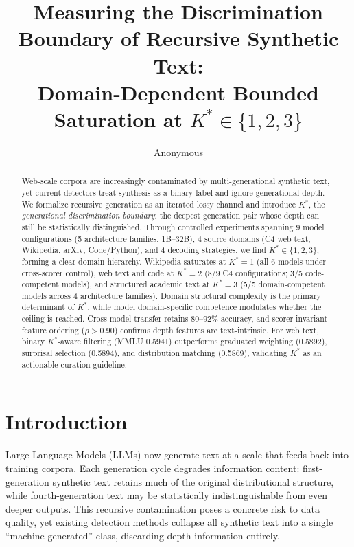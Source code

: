 \documentclass[11pt,a4paper]{article}
\title{Measuring the Discrimination Boundary of Recursive Synthetic Text:\\Domain-Dependent Bounded Saturation at $K^*\!\in\!\{1,2,3\}$}
\author{Anonymous}
\date{}
\begin{document}
\maketitle

\begin{abstract}
Web-scale corpora are increasingly contaminated by multi-generational synthetic text, yet current detectors treat synthesis as a binary label and ignore generational depth. We formalize recursive generation as an iterated lossy channel and introduce $K^*$, the \emph{generational discrimination boundary}: the deepest generation pair whose depth can still be statistically distinguished. Through controlled experiments spanning 9 model configurations (5 architecture families, 1B--32B), 4 source domains (C4 web text, Wikipedia, arXiv, Code/Python), and 4 decoding strategies, we find $K^*\!\in\!\{1,2,3\}$, forming a clear domain hierarchy. Wikipedia saturates at $K^*\!=\!1$ (all 6 models under cross-scorer control), web text and code at $K^*\!=\!2$ (8/9 C4 configurations; 3/5 code-competent models), and structured academic text at $K^*\!=\!3$ (5/5 domain-competent models across 4 architecture families). Domain structural complexity is the primary determinant of $K^*$, while model domain-specific competence modulates whether the ceiling is reached. Cross-model transfer retains 80--92\% accuracy, and scorer-invariant feature ordering ($\rho\!>\!0.90$) confirms depth features are text-intrinsic. For web text, binary $K^*$-aware filtering (MMLU 0.5941) outperforms graduated weighting (0.5892), surprisal selection (0.5894), and distribution matching (0.5869), validating $K^*$ as an actionable curation guideline.
\end{abstract}


\section{Introduction}

Large Language Models (LLMs) now generate text at a scale that feeds back into training corpora. Each generation cycle degrades information content: first-generation synthetic text retains much of the original distributional structure, while fourth-generation text may be statistically indistinguishable from even deeper outputs. This recursive contamination poses a concrete risk to data quality, yet existing detection methods collapse all synthetic text into a single ``machine-generated'' class, discarding depth information entirely.
\end{document}
